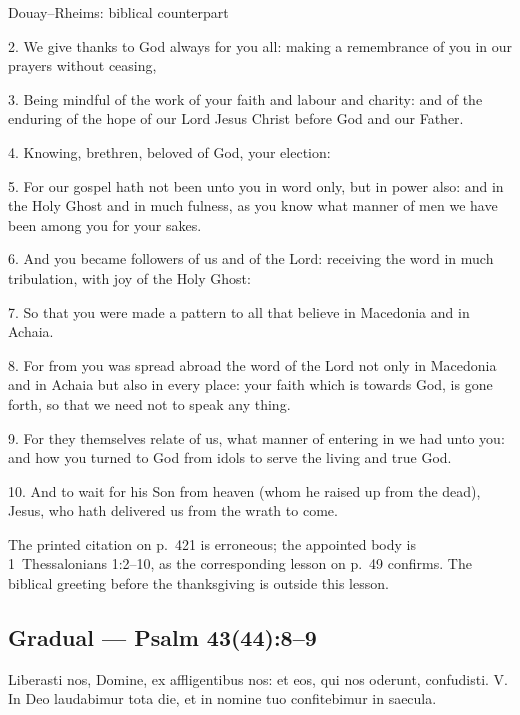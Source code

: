 \begin{englishwitness}{Douay--Rheims: biblical counterpart}

2. We give thanks to God always for you all: making a remembrance of you in our prayers without ceasing,

3. Being mindful of the work of your faith and labour and charity: and of the enduring of the hope of our Lord Jesus Christ before God and our Father.

4. Knowing, brethren, beloved of God, your election:

5. For our gospel hath not been unto you in word only, but in power also: and in the Holy Ghost and in much fulness, as you know what manner of men we have been among you for your sakes.

6. And you became followers of us and of the Lord: receiving the word in much tribulation, with joy of the Holy Ghost:

7. So that you were made a pattern to all that believe in Macedonia and in Achaia.

8. For from you was spread abroad the word of the Lord not only in Macedonia and in Achaia but also in every place: your faith which is towards God, is gone forth, so that we need not to speak any thing.

9. For they themselves relate of us, what manner of entering in we had unto you: and how you turned to God from idols to serve the living and true God.

10. And to wait for his Son from heaven (whom he raised up from the dead), Jesus, who hath delivered us from the wrath to come.

\end{englishwitness}

The printed citation on p.~421 is erroneous; the appointed body is 1~Thessalonians 1:2--10, as the corresponding lesson on p.~49 confirms. The biblical greeting before the thanksgiving is outside this lesson.

\subsection{Gradual --- Psalm 43(44):8–9}

\label{proper-gradual}


\begin{latinproper}

Liberasti nos, Domine, ex affligentibus nos: et eos, qui nos oderunt, confudisti. V. In Deo laudabimur tota die, et in nomine tuo confitebimur in saecula.

\end{latinproper}

